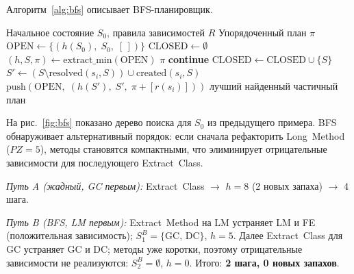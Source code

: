 \documentclass[conference]{IEEEtran}
\begin{document}
Алгоритм~\ref{alg:bfs} описывает BFS-планировщик.

\begin{algorithm}[tb]
\caption{BFS-планировщик рефакторинга}
\label{alg:bfs}
\begin{algorithmic}[1]
\REQUIRE Начальное состояние $S_0$, правила зависимостей $R$
\ENSURE Упорядоченный план $\pi$
\STATE $\text{OPEN} \leftarrow \{(h(S_0),\;S_0,\;[\,])\}$
\STATE $\text{CLOSED} \leftarrow \emptyset$
  \STATE $(h, S, \pi) \leftarrow \text{extract\_min}(\text{OPEN})$
    \RETURN $\pi$
  \ENDIF
    \STATE \textbf{continue}
  \ENDIF
  \STATE $\text{CLOSED} \leftarrow \text{CLOSED} \cup \{S\}$
    \STATE $S' \leftarrow (S \setminus \mathrm{resolved}(s_i, S))
                          \cup \mathrm{created}(s_i, S)$
      \STATE $\text{push}(\text{OPEN},\;
             (h(S'),\;S',\;\pi + [r(s_i)]))$
    \ENDIF
  \ENDFOR
\ENDWHILE
\RETURN лучший найденный частичный план
\end{algorithmic}
\end{algorithm}

На рис.~\ref{fig:bfs} показано дерево поиска для $S_0$ из
предыдущего примера.
BFS обнаруживает альтернативный порядок: если сначала рефакторить
Long~Method ($PZ{=}5$), методы становятся компактными, что
элиминирует отрицательные зависимости для последующего
Extract~Class.

\textit{Путь A (жадный, GC первым):}
Extract~Class $\to$ $h{=}8$ (2 новых запаха) $\to$ 4 шага.

\textit{Путь B (BFS, LM первым):}
Extract~Method на LM устраняет LM и FE
(положительная зависимость);
$S_1^B = \{\mathrm{GC},\,\mathrm{DC}\}$, $h{=}5$.
Далее Extract~Class для GC устраняет GC и DC;
методы уже коротки, поэтому отрицательные зависимости
не реализуются:
$S_2^B = \emptyset$, $h{=}0$.
Итого: \textbf{2 шага, 0 новых запахов}.
\end{document}
